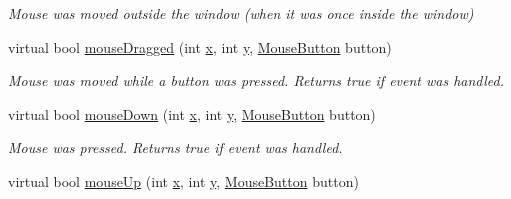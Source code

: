\begin{DoxyCompactItemize}
\begin{DoxyCompactList}\small\item\em Mouse was moved outside the window (when it was once inside the window) \end{DoxyCompactList}\item 
\hypertarget{classGUI_1_1Window_aabcaf5fde42d86523e2526ce54c50065}{virtual bool \hyperlink{classGUI_1_1Window_aabcaf5fde42d86523e2526ce54c50065}{mouse\-Dragged} (int \hyperlink{classGUI_1_1Window_a6ca6a80ca00c9e1d8ceea8d3d99a657d}{x}, int \hyperlink{classGUI_1_1Window_a0ee8e923aff2c3661fc2e17656d37adf}{y}, \hyperlink{namespaceGUI_ad06082a7b02aa73697f39eb8e0856de9}{Mouse\-Button} button)}\label{classGUI_1_1Window_aabcaf5fde42d86523e2526ce54c50065}

\begin{DoxyCompactList}\small\item\em Mouse was moved while a button was pressed. Returns true if event was handled. \end{DoxyCompactList}\item 
\hypertarget{classGUI_1_1Window_ad31c6dfb6d075046890a46b79b1b4ca1}{virtual bool \hyperlink{classGUI_1_1Window_ad31c6dfb6d075046890a46b79b1b4ca1}{mouse\-Down} (int \hyperlink{classGUI_1_1Window_a6ca6a80ca00c9e1d8ceea8d3d99a657d}{x}, int \hyperlink{classGUI_1_1Window_a0ee8e923aff2c3661fc2e17656d37adf}{y}, \hyperlink{namespaceGUI_ad06082a7b02aa73697f39eb8e0856de9}{Mouse\-Button} button)}\label{classGUI_1_1Window_ad31c6dfb6d075046890a46b79b1b4ca1}

\begin{DoxyCompactList}\small\item\em Mouse was pressed. Returns true if event was handled. \end{DoxyCompactList}\item 
\hypertarget{classGUI_1_1Window_a96c8b224c081a58dc4cd53192da1332b}{virtual bool \hyperlink{classGUI_1_1Window_a96c8b224c081a58dc4cd53192da1332b}{mouse\-Up} (int \hyperlink{classGUI_1_1Window_a6ca6a80ca00c9e1d8ceea8d3d99a657d}{x}, int \hyperlink{classGUI_1_1Window_a0ee8e923aff2c3661fc2e17656d37adf}{y}, \hyperlink{namespaceGUI_ad06082a7b02aa73697f39eb8e0856de9}{Mouse\-Button} button)}\label{classGUI_1_1Window_a96c8b224c081a58dc4cd53192da1332b}


\end{DoxyCompactItemize}
